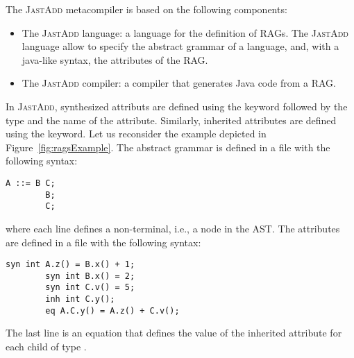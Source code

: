 The \textsc{JastAdd} metacompiler is based on the following components:
\begin{itemize}
    \item The \textsc{JastAdd} language: a language for the definition of RAGs.
    The \textsc{JastAdd} language allow to specify the abstract grammar of a language, and,
    with a java-like syntax, the attributes of the RAG.
    \item The \textsc{JastAdd} compiler: a compiler that generates Java code from a RAG.
\end{itemize}
In \textsc{JastAdd}, synthesized attributs are defined using the  keyword followed
by the type and the name of the attribute. Similarly, inherited attributes are defined
using the  keyword. Let us reconsider the example depicted in Figure~\ref{fig:ragsExample}.
The abstract grammar is defined in a  file with the following syntax:
    \begin{lstlisting}[language=JastAdd]
        A ::= B C;
        B;
        C;
    \end{lstlisting}
where each line defines a non-terminal, i.e., a node in the AST.
The attributes are defined in a  file with the following syntax:
    \begin{lstlisting}[language=JastAdd]
        syn int A.z() = B.x() + 1;
        syn int B.x() = 2;
        syn int C.v() = 5;
        inh int C.y();
        eq A.C.y() = A.z() + C.v();
    \end{lstlisting}
The last line is an equation that defines the value of the inherited attribute  for each child of type .
